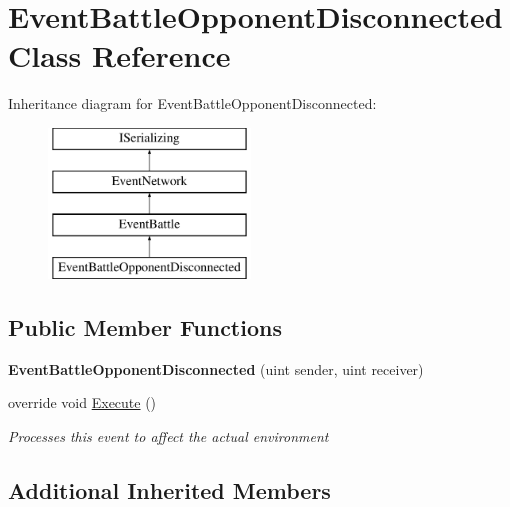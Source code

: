 \hypertarget{class_event_battle_opponent_disconnected}{\section{Event\-Battle\-Opponent\-Disconnected Class Reference}
\label{class_event_battle_opponent_disconnected}
}
Inheritance diagram for Event\-Battle\-Opponent\-Disconnected\-:\begin{figure}[H]
\begin{center}
\leavevmode
\includegraphics[height=4.000000cm]{class_event_battle_opponent_disconnected}
\end{center}
\end{figure}
\subsection*{Public Member Functions}
\begin{DoxyCompactItemize}
\item 
\hypertarget{class_event_battle_opponent_disconnected_a3708f2dcdca06bed68f8818e595b311a}{{\bfseries Event\-Battle\-Opponent\-Disconnected} (uint sender, uint receiver)}\label{class_event_battle_opponent_disconnected_a3708f2dcdca06bed68f8818e595b311a}

\item 
override void \hyperlink{class_event_battle_opponent_disconnected_aa08461a61a0c80ee3cb37b488af30e00}{Execute} ()
\begin{DoxyCompactList}\small\item\em Processes this event to affect the actual environment \end{DoxyCompactList}\end{DoxyCompactItemize}
\subsection*{Additional Inherited Members}


